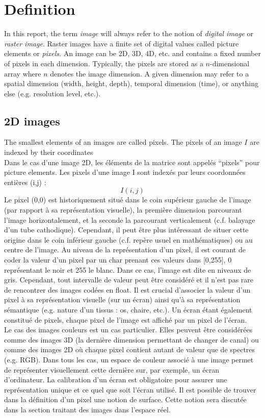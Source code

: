 \section{Definition}

In this report, the term \textit{image} will always refer to the notion of \textit{digital image} or \textit{raster image}. Raster images have a finite set of digital values called picture elements or \textit{pixels}. An image can be 2D, 3D, 4D, etc. and contains a fixed number of pixels in each dimension. Typically, the pixels are stored as a $n$-dimensional array where $n$ denotes the image dimension. A given dimension may refer to a spatial dimension (width, height, depth), temporal dimension (time), or anything else (e.g. resolution level, etc.).


\subsection{2D images}

The smallest elements of an images are called pixels. The pixels of an image $I$ are indexed by their coordinates
\\
Dans le cas d’une image 2D, les éléments de la matrice sont appelés ``pixels'' pour picture elements.  Les pixels d’une image I sont indexés par leurs coordonnées entières (i,j) :
$$
I(i,j)
$$
Le pixel (0,0) est historiquement situé dans le coin supérieur gauche de l’image (par rapport à sa représentation visuelle), la première dimension parcourant l’image horizontalement, et la seconde la parcourant verticalement (c.f. balayage d’un tube cathodique). Cependant, il peut être plus intéressant de situer cette origine dans le coin inférieur gauche (c.f. repère usuel en mathématiques) ou au centre de l’image.
Au niveau de la représentation d’un pixel, il est courant de coder la valeur d’un pixel par un char prenant ces valeurs dans [0,255], 0 représentant le noir et 255 le blanc. Dans ce cas, l’image est dite en niveaux de gris. Cependant, tout intervalle de valeur peut être considéré et il n’est pas rare de rencontrer des images codées en float. Il est crucial d’associer la valeur d’un pixel à sa représentation visuelle (sur un écran) ainsi qu’à sa représentation sémantique (e.g. nature d’un tissus : os, chaire, etc.). Un écran étant également constitué de pixels, chaque pixel de l’image est affiché par un pixel de l’écran.
\\
Le cas des images couleurs est un cas particulier. Elles peuvent être considérées comme des images 3D (la dernière dimension permettant de changer de canal) ou comme des images 2D où chaque pixel contient autant de valeur que de spectres (e.g. RGB). Dans tous les cas, un espace de couleur associé à une image permet de représenter visuellement cette dernière sur, par exemple, un écran d’ordinateur. La calibration d’un écran est obligatoire pour assurer une représentation unique et ce quel que soit l’écran utilisé.
Il est possible de trouver dans la définition d’un pixel une notion de surface. Cette notion sera discutée dans la section traitant des images dans l’espace réel.

